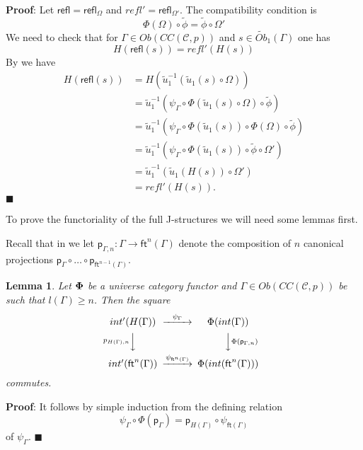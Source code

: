 \documentclass[12pt]{article}
\numberwithin{equation}{section}
\newenvironment{myproof}{{\bf Proof}:}{$\blacksquare$ \vskip 5mm }
\newtheorem{lemma}[proposition]{Lemma}
\newcommand{\llabel}[1]{\label{#1}}
\newcommand{\sr}{\rightarrow}
\newcommand{\wt}{\widetilde}
\newcommand{\toCC}{CC} %
\newcommand{\ft}{\mathsf{ft}}
\newcommand{\p}{\mathsf{p}}
\newcommand{\refl}{\mathsf{refl}}
\begin{document}
\begin{myproof}
Let $\refl=\refl_{\Omega}$ and $refl'=\refl_{\Omega'}$. The compatibility
condition is
%
$$\Phi(\Omega)\circ\wt{\phi}=\wt{\phi}\circ\Omega'$$
%
We need to check that for $\Gamma\in Ob(\toCC({\mathcal C},p))$ and $s\in
\wt{Ob}_1(\Gamma)$ one has
%
$$H(\refl(s))=refl'(H(s))$$
%
By \cite[Lemma 6.1(2)]{fromunivwithPi} we have
%
\begin{align*}
  H(\refl(s))
    & = H(\wt{u}_1^{-1}(\wt{u}_1(s)\circ\Omega)) \\
    & = \wt{u}_1^{-1}(\psi_{\Gamma}\circ\Phi(\wt{u}_1(s)\circ\Omega)\circ\wt{\phi}) \\
    & = \wt{u}_1^{-1}(\psi_{\Gamma}\circ\Phi(\wt{u}_1(s))\circ\Phi(\Omega)\circ \wt{\phi}) \\
    & = \wt{u}_1^{-1}(\psi_{\Gamma}\circ\Phi(\wt{u}_1(s))\circ\wt{\phi}\circ\Omega') \\
    & = \wt{u}_1^{-1}(\wt{u}_1(H(s))\circ\Omega') \\
    & = refl'(H(s)).
\end{align*}
\end{myproof}
%

To prove the functoriality of the full J-structures we will need some lemmas
first.

Recall that in \cite{Csubsystems} we let $\p_{\Gamma,n}:\Gamma\sr \ft^n(\Gamma)$
denote the composition of $n$ canonical projections $\p_{\Gamma}\circ \dots\circ
\p_{\ft^{n-1}(\Gamma)}$.
%
\begin{lemma}
\llabel{2015.05.10.l1} Let ${\bf\Phi}$ be a universe category functor and
$\Gamma\in Ob(\toCC({\mathcal C},p))$ be such that $l(\Gamma)\ge n$. Then the
square
%
$$
\begin{CD}
int'(H(\Gamma)) @>\psi_{\Gamma}>> \Phi(int(\Gamma))\\ @Vp_{H(\Gamma),n} VV
@VV\Phi(\p_{\Gamma,n})V\\ int'(\ft^n(\Gamma)) @>\psi_{\ft^n(\Gamma)}>>
\Phi(int(\ft^n(\Gamma)))
\end{CD}
$$
%
commutes.
\end{lemma}
%
\begin{myproof}
It follows by simple induction from the defining relation
%
$$\psi_{\Gamma}\circ \Phi(\p_{\Gamma})=\p_{H(\Gamma)}\circ \psi_{\ft(\Gamma)}$$
%
of $\psi_{\Gamma}$.
\end{myproof}
\end{document}
